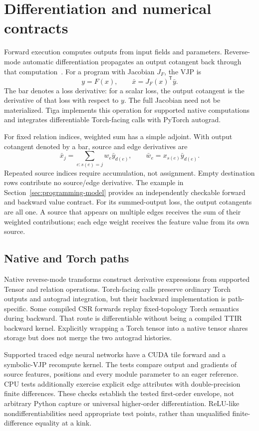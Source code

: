 \section{Differentiation and numerical contracts}
\label{sec:differentiation}
Forward execution computes outputs from input fields and parameters. Reverse-mode
automatic differentiation propagates an output cotangent back through that
computation~\cite{autodiff}. For a program with Jacobian $J_F$, the VJP is
$$
y=F(x),\qquad \bar{x}=J_F(x)^{\mathsf{T}}\bar{y}.
$$
The bar denotes a loss derivative: for a scalar loss, the output cotangent is
the derivative of that loss with respect to $y$. The full Jacobian need not be
materialized. Tiga implements this operation for supported native computations
and integrates differentiable Torch-facing calls with PyTorch autograd.

For fixed relation indices, weighted sum has a simple adjoint. With output
cotangent denoted by a bar, source and edge derivatives are
$$
 \bar{x}_j=\sum_{e:s(e)=j}w_e\bar{y}_{d(e)},\qquad
 \bar{w}_e=x_{s(e)}\bar{y}_{d(e)}.
$$
Repeated source indices require accumulation, not assignment. Empty destination
rows contribute no source/edge derivative. The example in Section~\ref{sec:programming-model} provides
an independently checkable forward and backward value contract.
For its summed-output loss, the output cotangents are all one. A source that
appears on multiple edges receives the sum of their weighted contributions;
each edge weight receives the feature value from its own source.

\subsection{Native and Torch paths}
Native reverse-mode transforms construct derivative expressions from supported
Tensor and relation operations. Torch-facing calls preserve ordinary Torch
outputs and autograd integration, but their backward implementation is path-specific.
Some compiled CSR forwards replay fixed-topology Torch semantics during backward.
That route is differentiable without being a compiled TTIR backward kernel.
Explicitly wrapping a Torch tensor into a native tensor shares storage but does
not merge the two autograd histories.

Supported traced edge neural networks have a CUDA tile forward and a symbolic-VJP
recompute kernel. The tests compare output and gradients of source features,
positions and every module parameter to an eager reference. CPU tests additionally exercise explicit edge
attributes with double-precision finite differences. These checks establish the
tested first-order envelope, not arbitrary Python capture or universal
higher-order differentiation. ReLU-like nondifferentiabilities need appropriate
test points, rather than unqualified finite-difference equality at a kink.

